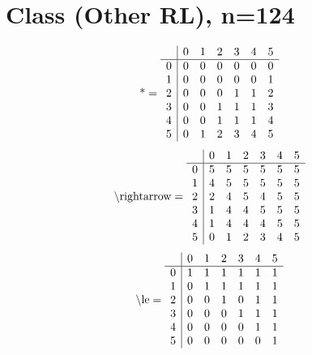 \documentclass[11pt]{article}
\begin{document}
\section{Class (Other RL), n=124}
\[\text{*} = 
\begin{array}{r | r r r r r r}
 & 0 & 1 & 2 & 3 & 4 & 5 \\ \hline
0 & 0 & 0 & 0 & 0 & 0 & 0 \\
1 & 0 & 0 & 0 & 0 & 0 & 1 \\
2 & 0 & 0 & 0 & 1 & 1 & 2 \\
3 & 0 & 0 & 1 & 1 & 1 & 3 \\
4 & 0 & 0 & 1 & 1 & 1 & 4 \\
5 & 0 & 1 & 2 & 3 & 4 & 5 \\
\end{array}
\]
\[\text{\textbackslash rightarrow} = 
\begin{array}{r | r r r r r r}
 & 0 & 1 & 2 & 3 & 4 & 5 \\ \hline
0 & 5 & 5 & 5 & 5 & 5 & 5 \\
1 & 4 & 5 & 5 & 5 & 5 & 5 \\
2 & 2 & 4 & 5 & 4 & 5 & 5 \\
3 & 1 & 4 & 4 & 5 & 5 & 5 \\
4 & 1 & 4 & 4 & 4 & 5 & 5 \\
5 & 0 & 1 & 2 & 3 & 4 & 5 \\
\end{array}
\]
\[\text{\textbackslash le} = 
\begin{array}{r | r r r r r r}
 & 0 & 1 & 2 & 3 & 4 & 5 \\ \hline
0 & 1 & 1 & 1 & 1 & 1 & 1 \\
1 & 0 & 1 & 1 & 1 & 1 & 1 \\
2 & 0 & 0 & 1 & 0 & 1 & 1 \\
3 & 0 & 0 & 0 & 1 & 1 & 1 \\
4 & 0 & 0 & 0 & 0 & 1 & 1 \\
5 & 0 & 0 & 0 & 0 & 0 & 1 \\
\end{array}
\]
\end{document}
